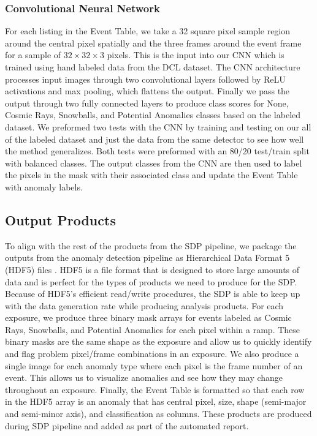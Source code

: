 \subsubsection{Convolutional Neural Network}
\label{chap5/sec:CNN}
For each listing in the Event Table, we take a 32 square pixel sample region around the central pixel spatially and the three frames around the event frame for a sample of $32 \times 32  \times 3$ pixels. 
This is the input into our CNN which is trained using hand labeled data from the DCL dataset. 
The CNN architecture processes input images through two convolutional layers followed by ReLU activations and max pooling, which flattens the output.
Finally we pass the output through two fully connected layers to produce class scores for None, Cosmic Rays, Snowballs, and Potential Anomalies classes based on the labeled dataset.
We preformed two tests with the CNN by training and testing on our all of the labeled dataset and just the data from the same detector to see how well the method generalizes. 
Both tests were preformed with an 80/20 test/train split with balanced classes. 
The output classes from the CNN are then used to label the pixels in the mask with their associated class and update the Event Table with anomaly labels. 
\subsection{Output Products}
To align with the rest of the products from the SDP pipeline, we package the outputs from the anomaly detection pipeline as Hierarchical Data Format 5 (HDF5) files \cite{The_HDF_Group_Hierarchical_Data_Format}.
HDF5 is a file format that is designed to store large amounts of data and is perfect for the types of products we need to produce for the SDP.
Because of HDF5's efficient read/write procedures, the SDP is able to keep up with the data generation rate while producing analysis products. 
For each exposure, we produce three binary mask arrays for events labeled as Cosmic Rays, Snowballs, and Potential Anomalies for each pixel within a ramp. 
These binary masks are the same shape as the exposure and allow us to quickly identify and flag problem pixel/frame combinations in an exposure. 
We also produce a single image for each anomaly type where each pixel is the frame number of an event. 
This allows us to visualize anomalies and see how they may change throughout an exposure.
Finally, the Event Table is formatted so that each row in the HDF5 array is an anomaly that has central pixel, size, shape (semi-major and semi-minor axis), and classification as columns. 
These products are produced during SDP pipeline and added as part of the automated report. 
